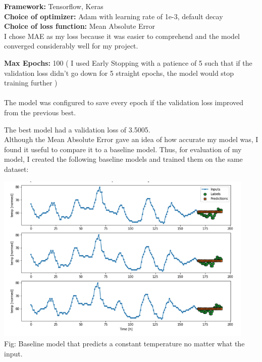 \documentclass[paper=a4, fontsize=11pt, margin=1in]{scrartcl}
\numberwithin{equation}{section}		%
\numberwithin{figure}{section}			%
\numberwithin{table}{section}				%
\begin{document}
\textbf{Framework: } Tensorflow, Keras\\
\textbf{Choice of optimizer:} Adam with learning rate of 1e-3, default decay\\
\textbf{Choice of loss function: } Mean Absolute Error\\
I chose MAE as my loss because it was easier to comprehend and the model converged considerably well for my project. 

\textbf{Max Epochs: } 100 ( I used Early Stopping with a patience of 5 such that if the validation loss didn't go down for 5 straight epochs, the model would stop training further )\\
\\
The model was configured to save every epoch if the validation loss improved from the previous best.

The best model had a validation loss of 3.5005.\\

Although the Mean Absolute Error gave an idea of how accurate my model was, I found it useful to compare it to a baseline model. Thus, for evaluation of my model, I created the following baseline models and trained them on the same dataset:

\begin{center}
\includegraphics[width=0.93\textwidth]{base-1.png}\\
Fig: Baseline model that predicts a constant temperature no matter what the input.\\
\end{center}
\end{document}
